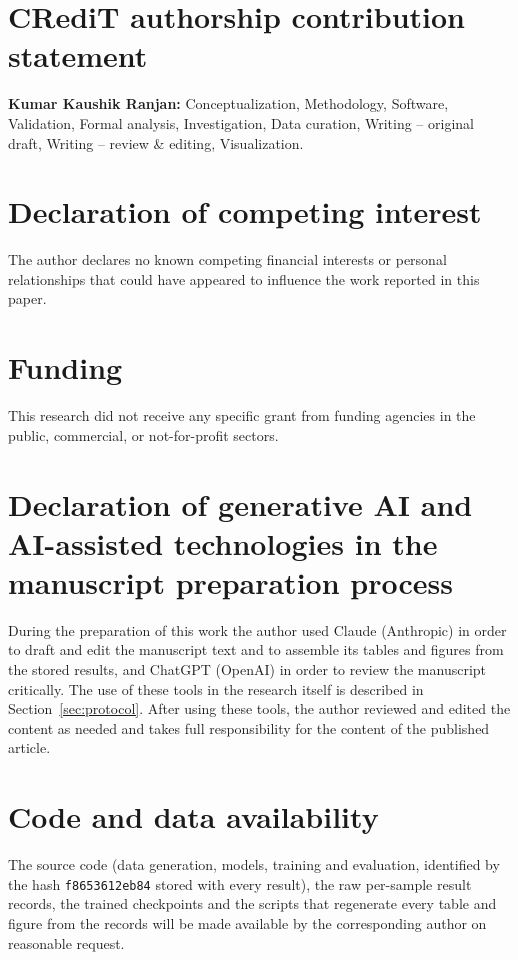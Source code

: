 \section*{CRediT authorship contribution statement}
\textbf{Kumar Kaushik Ranjan:} Conceptualization, Methodology, Software, Validation, Formal analysis, Investigation, Data
curation, Writing -- original draft, Writing -- review \& editing, Visualization.

\section*{Declaration of competing interest}
The author declares no known competing financial interests or personal relationships that could have appeared to
influence the work reported in this paper.

\section*{Funding}
This research did not receive any specific grant from funding agencies in the public, commercial, or not-for-profit sectors.

\section*{Declaration of generative AI and AI-assisted technologies in the manuscript preparation process}
During the preparation of this work the author used Claude (Anthropic) in order to draft and edit the manuscript text and to
assemble its tables and figures from the stored results, and ChatGPT (OpenAI) in order to review the manuscript critically.
The use of these tools in the research itself is described in Section~\ref{sec:protocol}. After using these tools, the author
reviewed and edited the content as needed and takes full responsibility for the content of the published article.

\section*{Code and data availability}
The source code (data generation, models, training and evaluation, identified by the hash \texttt{f8653612eb84} stored with
every result), the raw per-sample result records, the trained checkpoints and the scripts that regenerate every table and
figure from the records will be made available by the corresponding author on reasonable request.
